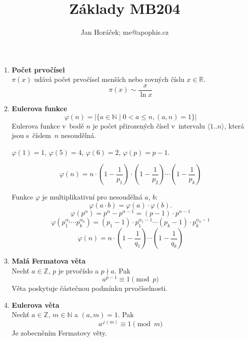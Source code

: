 \documentclass[12pt,a4paper]{article}
\begin{document}
\title{\vspace{-1.5cm}Základy MB204}
\author{Jan Horáček; me@apophis.cz}
\maketitle

\begin{enumerate}[leftmargin=*]
	\item \textbf{Počet prvočísel}\\
		$\pi(x)$ udává počet prvočísel menších nebo rovných číslu $x \in \mathbb{R}$. \\
		\[ \pi(x) \sim \frac{x}{\ln{x}} \]


	\item \textbf{Eulerova funkce}
		\[ \varphi(n) = |\{ a \in \mathbb{N} \mid 0 < a \le n, (a,n) = 1\}| \]
		Eulerova funkce v~bodě $n$ je počet přirozených čísel v~intervalu
		$\langle 1..n \rangle$, která jsou s~číslem~$n$ nesoudělná.

		$\varphi(1) = 1$, $\varphi(5) = 4$, $\varphi(6) = 2$, $\varphi(p) = p-1$.

		\[ \varphi(n) = n \cdot \left( 1 - \frac{1}{p_1} \right) \cdot
			\left( 1 - \frac{1}{p_2} \right) \cdots \left( 1 - \frac{1}{p_k} \right) \]

		Funkce $\varphi$ je multiplikativní pro nesoudělná $a$, $b$:
		\[ \varphi(a \cdot b) = \varphi(a) \cdot \varphi(b). \]
		\[ \varphi(p^\alpha) = p^\alpha - p^{\alpha-1} = (p - 1) \cdot p^{\alpha-1}\]
		\[ \varphi(p_1^{\alpha_1} \cdots p_k^{\alpha_k}) = (p_1 - 1) \cdot
			p_1^{\alpha_1-1} \cdots (p_k - 1) \cdot p_k^{\alpha_k-1} \]
		\[ \varphi(n) = n \cdot \left( 1 - \frac{1}{q_1} \right) \cdots
			\left( 1 - \frac{1}{q_k} \right) \]

	\item \textbf{Malá Fermatova věta}\\
		Nechť $a \in \mathbb{Z}$, $p$ je prvočíslo a $p \nmid a$. Pak
		\[ a^{p-1} \equiv 1 \pmod{p} \]
		Věta poskytuje částečnou podmínku prvočíselnosti.

	\item \textbf{Eulerova věta}\\
		Nechť $a \in \mathbb{Z}$, $m \in \mathbb{N}$ a $(a,m) = 1$. Pak
		\[ a^{\varphi(m)} \equiv 1 \pmod{m} \]
		Je zobecněním Fermatovy věty.


\end{enumerate}
\end{document}
